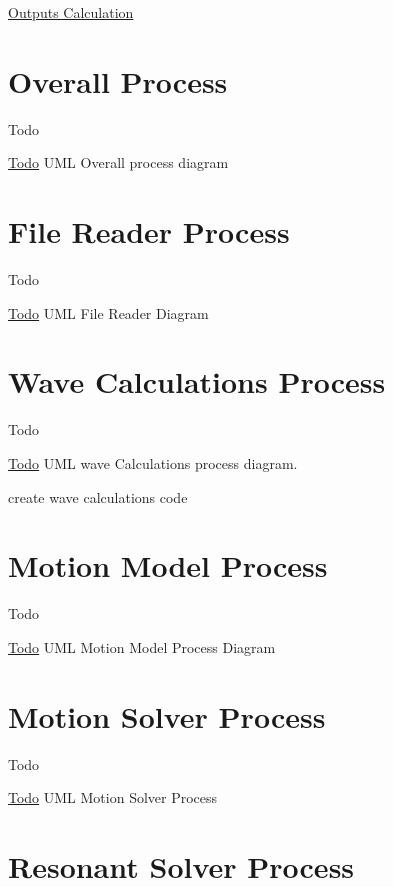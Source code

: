 \hyperlink{UML_OutputsCalculation}{Outputs Calculation} \hypertarget{uml_overall}{}\section{Overall Process}\label{uml_overall}
\begin{DoxyRefDesc}{Todo}
\item[\hyperlink{todo__todo000018}{Todo}]U\-M\-L Overall process diagram\end{DoxyRefDesc}
\hypertarget{uml_filereader}{}\section{File Reader Process}\label{uml_filereader}
\begin{DoxyRefDesc}{Todo}
\item[\hyperlink{todo__todo000011}{Todo}]U\-M\-L File Reader Diagram\end{DoxyRefDesc}
\hypertarget{uml_wavecalculation}{}\section{Wave Calculations Process}\label{uml_wavecalculation}
\begin{DoxyRefDesc}{Todo}
\item[\hyperlink{todo__todo000023}{Todo}]U\-M\-L wave Calculations process diagram. 

create wave calculations code\end{DoxyRefDesc}
\hypertarget{uml_motionmodel}{}\section{Motion Model Process}\label{uml_motionmodel}
\begin{DoxyRefDesc}{Todo}
\item[\hyperlink{todo__todo000013}{Todo}]U\-M\-L Motion Model Process Diagram\end{DoxyRefDesc}
\hypertarget{uml_motionsolver}{}\section{Motion Solver Process}\label{uml_motionsolver}
\begin{DoxyRefDesc}{Todo}
\item[\hyperlink{todo__todo000014}{Todo}]U\-M\-L Motion Solver Process\end{DoxyRefDesc}
\hypertarget{uml_resonantsolver}{}\section{Resonant Solver Process}\label{uml_resonantsolver}
